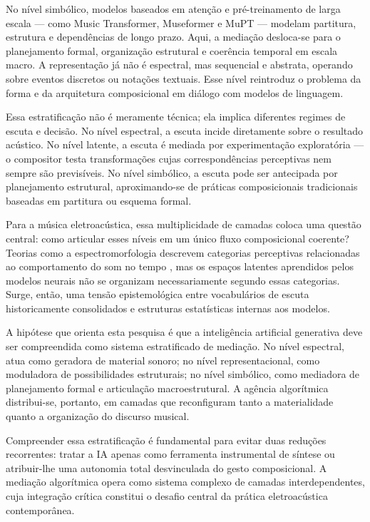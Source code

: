 No nível simbólico, modelos baseados em atenção e pré-treinamento de larga escala — como Music Transformer, Museformer e MuPT \cite{huang2018musictransformer,zeng2022museformer,qu2024mupt} — modelam partitura, estrutura e dependências de longo prazo. Aqui, a mediação desloca-se para o planejamento formal, organização estrutural e coerência temporal em escala macro. A representação já não é espectral, mas sequencial e abstrata, operando sobre eventos discretos ou notações textuais. Esse nível reintroduz o problema da forma e da arquitetura composicional em diálogo com modelos de linguagem.

Essa estratificação não é meramente técnica; ela implica diferentes regimes de escuta e decisão. No nível espectral, a escuta incide diretamente sobre o resultado acústico. No nível latente, a escuta é mediada por experimentação exploratória — o compositor testa transformações cujas correspondências perceptivas nem sempre são previsíveis. No nível simbólico, a escuta pode ser antecipada por planejamento estrutural, aproximando-se de práticas composicionais tradicionais baseadas em partitura ou esquema formal.

Para a música eletroacústica, essa multiplicidade de camadas coloca uma questão central: como articular esses níveis em um único fluxo composicional coerente? Teorias como a espectromorfologia descrevem categorias perceptivas relacionadas ao comportamento do som no tempo \cite{smalley1997spectromorphology}, mas os espaços latentes aprendidos pelos modelos neurais não se organizam necessariamente segundo essas categorias. Surge, então, uma tensão epistemológica entre vocabulários de escuta historicamente consolidados e estruturas estatísticas internas aos modelos.

A hipótese que orienta esta pesquisa é que a inteligência artificial generativa deve ser compreendida como sistema estratificado de mediação. No nível espectral, atua como geradora de material sonoro; no nível representacional, como moduladora de possibilidades estruturais; no nível simbólico, como mediadora de planejamento formal e articulação macroestrutural. A agência algorítmica distribui-se, portanto, em camadas que reconfiguram tanto a materialidade quanto a organização do discurso musical.

Compreender essa estratificação é fundamental para evitar duas reduções recorrentes: tratar a IA apenas como ferramenta instrumental de síntese ou atribuir-lhe uma autonomia total desvinculada do gesto composicional. A mediação algorítmica opera como sistema complexo de camadas interdependentes, cuja integração crítica constitui o desafio central da prática eletroacústica contemporânea.



